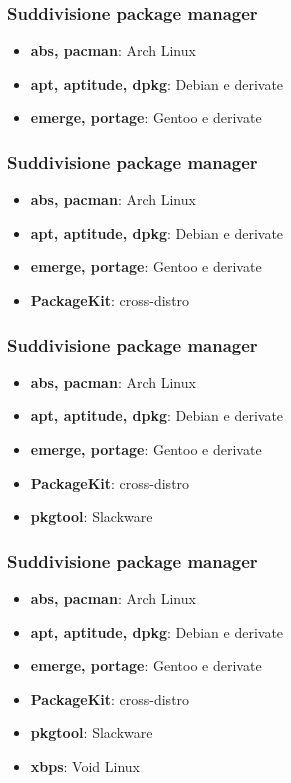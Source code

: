 \documentclass{beamer}
\begin{document}

\begin{frame}
	\frametitle{Suddivisione package manager}
	\begin{itemize}
		\item \textbf{abs, pacman}: Arch Linux
		\item \textbf{apt, aptitude, dpkg}: Debian e derivate
		\item \textbf{emerge, portage}: Gentoo e derivate
	\end{itemize}
\end{frame}


\begin{frame}
	\frametitle{Suddivisione package manager}
	\begin{itemize}
		\item \textbf{abs, pacman}: Arch Linux
		\item \textbf{apt, aptitude, dpkg}: Debian e derivate
		\item \textbf{emerge, portage}: Gentoo e derivate
		\item \textbf{PackageKit}: cross-distro
	\end{itemize}
\end{frame}


\begin{frame}
	\frametitle{Suddivisione package manager}
	\begin{itemize}
		\item \textbf{abs, pacman}: Arch Linux
		\item \textbf{apt, aptitude, dpkg}: Debian e derivate
		\item \textbf{emerge, portage}: Gentoo e derivate
		\item \textbf{PackageKit}: cross-distro
		\item \textbf{pkgtool}: Slackware
	\end{itemize}
\end{frame}


\begin{frame}
	\frametitle{Suddivisione package manager}
	\begin{itemize}
		\item \textbf{abs, pacman}: Arch Linux
		\item \textbf{apt, aptitude, dpkg}: Debian e derivate
		\item \textbf{emerge, portage}: Gentoo e derivate
		\item \textbf{PackageKit}: cross-distro
		\item \textbf{pkgtool}: Slackware
		\item \textbf{xbps}: Void Linux
	\end{itemize}
\end{frame}
\end{document}
